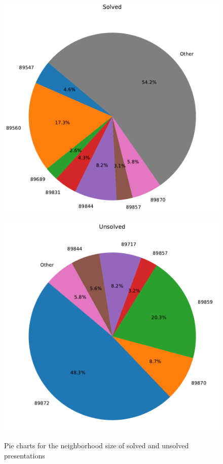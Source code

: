 \begin{figure}
	\centering
	\includegraphics[scale=.35]{fig/prime_solved_pie_rl_cropped.pdf}
	\ 
	\includegraphics[scale=.35]{fig/prime_unsolved_pie_rl_cropped.pdf}
	\caption{Pie charts for the neighborhood size of solved and unsolved presentations}
	\label{fig:prime_pies}
\end{figure}


